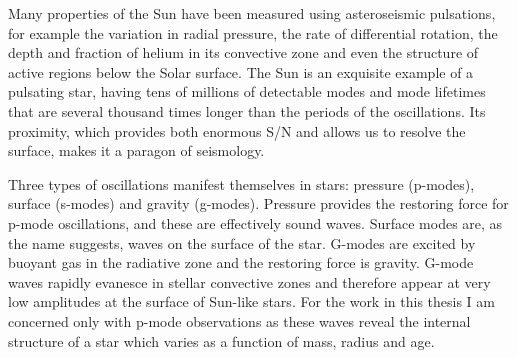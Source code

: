 Many properties of the Sun have been measured using asteroseismic pulsations,
for example the variation in radial pressure, the rate of differential
rotation, the depth and fraction of helium in its convective zone and even the
structure of active regions below the Solar surface.
The Sun is an exquisite example of a pulsating star, having tens of millions
of detectable modes and mode lifetimes that are several thousand times longer
than the periods of the oscillations.
Its proximity, which provides both enormous S/N and allows us to resolve the
surface, makes it a paragon of seismology.

Three types of oscillations manifest themselves in stars: pressure (p-modes),
surface (s-modes) and gravity (g-modes).
Pressure provides the restoring force for p-mode oscillations, and these are
effectively sound waves.
Surface modes are, as the name suggests, waves on the surface of the star.
G-modes are excited by buoyant gas in the radiative zone and the restoring
force is gravity.
G-mode waves rapidly evanesce in stellar convective zones and therefore
appear at very low amplitudes at the surface of Sun-like stars.
For the work in this thesis I am concerned only with p-mode observations as
these waves reveal the internal structure of a star which varies as a function
of mass, radius and age.

